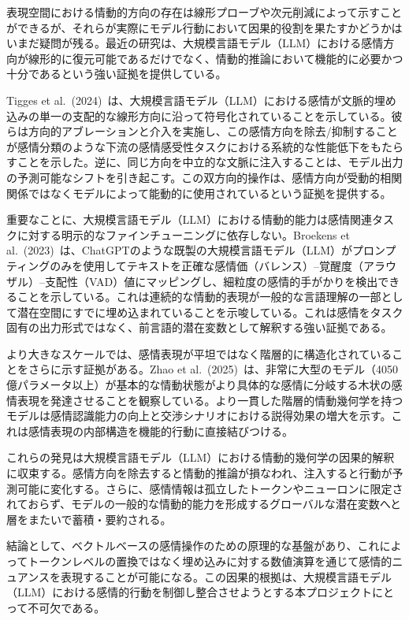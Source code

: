 表現空間における情動的方向の存在は線形プローブや次元削減によって示すことができるが、それらが実際にモデル行動において因果的役割を果たすかどうかはいまだ疑問が残る。最近の研究は、大規模言語モデル（LLM）における感情方向が線形的に復元可能であるだけでなく、情動的推論において機能的に必要かつ十分であるという強い証拠を提供している。

Tigges et al.\ (2024)~\cite{hollinsworth-etal-2024-language}は、大規模言語モデル（LLM）における感情が文脈的埋め込みの単一の支配的な線形方向に沿って符号化されていることを示している。彼らは方向的アブレーションと介入を実施し、この感情方向を除去/抑制することが感情分類のような下流の感情感受性タスクにおける系統的な性能低下をもたらすことを示した。逆に、同じ方向を中立的な文脈に注入することは、モデル出力の予測可能なシフトを引き起こす。この双方向的操作は、感情方向が受動的相関関係ではなくモデルによって能動的に使用されているという証拠を提供する。

重要なことに、大規模言語モデル（LLM）における情動的能力は感情関連タスクに対する明示的なファインチューニングに依存しない。Broekens et al.\ (2023)~\cite{broekens2023finegrainedaffectiveprocessingcapabilities}は、ChatGPTのような既製の大規模言語モデル（LLM）がプロンプティングのみを使用してテキストを正確な感情価（バレンス）--覚醒度（アラウザル）--支配性（VAD）値にマッピングし、細粒度の感情的手がかりを検出できることを示している。これは連続的な情動的表現が一般的な言語理解の一部として潜在空間にすでに埋め込まれていることを示唆している。これは感情をタスク固有の出力形式ではなく、前言語的潜在変数として解釈する強い証拠である。

より大きなスケールでは、感情表現が平坦ではなく階層的に構造化されていることをさらに示す証拠がある。Zhao et al.\ (2025)~\cite{zhao2025emergencehierarchicalemotionorganization}は、非常に大型のモデル（4050億パラメータ以上）が基本的な情動状態がより具体的な感情に分岐する木状の感情表現を発達させることを観察している。より一貫した階層的情動幾何学を持つモデルは感情認識能力の向上と交渉シナリオにおける説得効果の増大を示す。これは感情表現の内部構造を機能的行動に直接結びつける。

これらの発見は大規模言語モデル（LLM）における情動的幾何学の因果的解釈に収束する。感情方向を除去すると情動的推論が損なわれ、注入すると行動が予測可能に変化する。さらに、感情情報は孤立したトークンやニューロンに限定されておらず、モデルの一般的な情動的能力を形成するグローバルな潜在変数へと層をまたいで蓄積・要約される。

結論として、ベクトルベースの感情操作のための原理的な基盤があり、これによってトークンレベルの置換ではなく埋め込みに対する数値演算を通じて感情的ニュアンスを表現することが可能になる。この因果的根拠は、大規模言語モデル（LLM）における感情的行動を制御し整合させようとする本プロジェクトにとって不可欠である。

